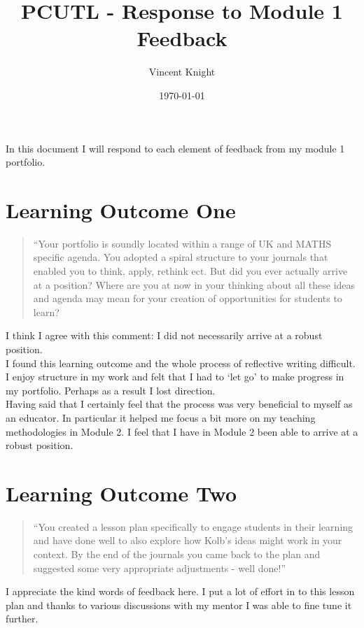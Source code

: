 \documentclass[a4paper,12pt]{article}
\title{PCUTL - Response to Module 1 Feedback}
\author{Vincent Knight}
\date{\today}
\begin{document}
\maketitle

In this document I will respond to each element of feedback from my module 1 portfolio.

\section{Learning Outcome One}

\begin{quote}
    ``Your portfolio is soundly located within a range of UK and MATHS specific agenda. You adopted a spiral structure to your journals that enabled you to think, apply, rethink ect. But did you ever actually arrive at a position? Where are you at now in your thinking about all these ideas and agenda may mean for your creation of opportunities for students to learn?
\end{quote}

I think I agree with this comment: I did not necessarily arrive at a robust position.\\

I found this learning outcome and the whole process of reflective writing difficult. I enjoy structure in my work and felt that I had to `let go' to make progress in my portfolio. Perhaps as a result I lost direction.\\

Having said that I certainly feel that the process was very beneficial to myself as an educator. In particular it helped me focus a bit more on my teaching methodologies in Module 2. I feel that I have in Module 2 been able to arrive at a robust position.

\section{Learning Outcome Two}

\begin{quote}
    ``You created a lesson plan specifically to engage students in their learning and have done well to also explore how Kolb's ideas might work in your context. By the end of the journals you came back to the plan and suggested some very appropriate adjustments - well done!''
\end{quote}

I appreciate the kind words of feedback here. I put a lot of effort in to this lesson plan and thanks to various discussions with my mentor I was able to fine tune it further.\\
\end{document}
